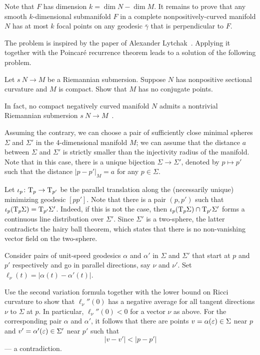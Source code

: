 Note that $F$ has dimension $k=\dim N-\dim M$.
It remains to prove that any smooth $k$-dimensional submanifold $F$ in a complete nonpositively-curved manifold $N$ has at most $k$ focal points on any geodesic $\bar \gamma$ that is perpendicular to $F$.\qeds

The problem is inspired by the paper of Alexander Lytchak~\cite{lytchak:conjugate}.
Applying it together with the Poincaré recurrence theorem
leads to a solution of the following problem.

\begin{pr}
Let $s\:N\to M$ be a Riemannian submersion.
Suppose $N$ has nonpositive sectional curvature and $M$ is compact.
Show that $M$ has no conjugate points.
\end{pr}

In fact, no compact negatively curved manifold $N$ admits a nontrivial Riemannian submersion $s\:N\to M$~\cite[see Theorem F in][]{zeghib}. 





Assuming the contrary,
we can choose a pair of sufficiently close minimal spheres $\Sigma$ and $\Sigma'$ in the 4-dimensional manifold $M$;
we can assume that the distance $a$ between $\Sigma$ and $\Sigma'$ is strictly smaller than the injectivity radius of the manifold.
Note that in this case, there is a unique bijection $\Sigma\to \Sigma'$, denoted by $p\mapsto p'$ such that the distance $|p-p'|_M=a$ for any $p\in\Sigma$.

Let $\iota_p\colon\mathrm{T}_p\to\mathrm{T}_{p'}$ be the parallel translation along the (necessarily unique) minimizing geodesic $[pp']$.
Note that there is a pair $(p,p')$ such that $\iota_p(\mathrm{T}_p\Sigma)=\mathrm{T}_{p'}\Sigma'$.
Indeed, if this is not the case, then $\iota_p(\T_p\Sigma)\z\cap\T_{p'}\Sigma'$ forms a continuous line distribution over $\Sigma'$.
Since $\Sigma'$ is a two-sphere, the latter contradicts the hairy ball theorem, which states that there is no non-vanishing vector field on the two-sphere.

Consider pairs of unit-speed geodesics $\alpha$ and $\alpha'$ 
in $\Sigma$ and $\Sigma'$  
that start at $p$ and $p'$ respectively
and go in parallel directions, say $\nu$ and $\nu'$. %
Set $\ell_\nu(t)=|\alpha(t)-\alpha'(t)|$.

Use the second variation formula together with the lower bound on Ricci curvature
to show that $\ell_\nu''(0)$ has a negative average for all tangent directions $\nu$ to $\Sigma$ at $p$. 
In particular, $\ell_\nu''(0)<0$ for a vector $\nu$ as above.
For the corresponding pair $\alpha$ and $\alpha'$,
it follows that there are points $v=\alpha(\varepsilon)\in\Sigma$ near $p$ 
and $v'=\alpha'(\varepsilon)\in\Sigma'$ near $p'$
such that 
\[|v-v'|<|p-p'|\]
--- a contradiction.\qeds

